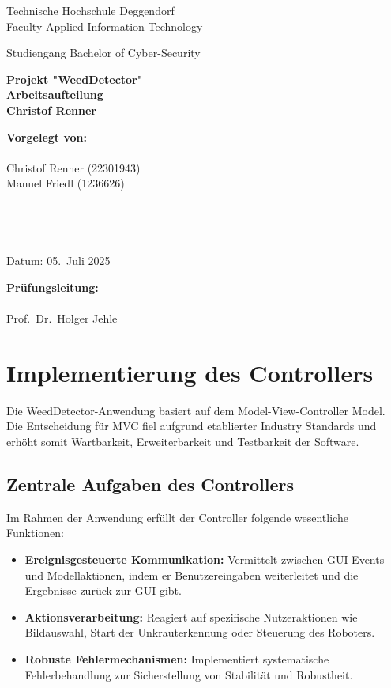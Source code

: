 \documentclass[12pt, a4paper]{scrreprt}
\newcommand{\faculty}{Faculty Applied Information Technology}
\newcommand{\studies}{Bachelor of Cyber-Security}
\newcommand{\thesistitleDE}{Projekt "WeedDetector" \\ Arbeitsaufteilung \\ Christof Renner}
\newcommand{\submissiondate}{05.\ Juli 2025}
\newcommand{\supervisor}{Prof.\ Dr.\ Holger Jehle}
\begin{document}
\begin{titlepage}
  \centering
  {\LARGE Technische Hochschule Deggendorf \\ \faculty \par}
  \vspace{0.3cm}
  {\Large Studiengang \studies \\[1.5cm]}
  {\Huge\bfseries \thesistitleDE\par}
  \vfill
  \begin{minipage}[t]{0.45\textwidth}
    \textbf{Vorgelegt von:}\\
    \\
    Christof Renner (22301943)\\
    Manuel Friedl (1236626)\\
    \\
    \\
    \\
    \\
    Datum: \submissiondate
  \end{minipage}\hfill
  \begin{minipage}[t]{0.45\textwidth}
    \textbf{Prüfungsleitung:}\\
    \\
    \supervisor
  \end{minipage}
\end{titlepage}

\tableofcontents
\newpage

\chapter{Implementierung des Controllers}

Die WeedDetector-Anwendung basiert auf dem Model-View-Controller Model. Die Entscheidung für MVC fiel aufgrund etablierter Industry Standards und erhöht somit Wartbarkeit, Erweiterbarkeit und Testbarkeit der Software.

\section{Zentrale Aufgaben des Controllers}

Im Rahmen der Anwendung erfüllt der Controller folgende wesentliche Funktionen:

\begin{itemize}
    \item \textbf{Ereignisgesteuerte Kommunikation:} Vermittelt zwischen GUI-Events und Modellaktionen, indem er Benutzereingaben weiterleitet und die Ergebnisse zurück zur GUI gibt.
    \item \textbf{Aktionsverarbeitung:} Reagiert auf spezifische Nutzeraktionen wie Bildauswahl, Start der Unkrauterkennung oder Steuerung des Roboters.
    \item \textbf{Robuste Fehlermechanismen:} Implementiert systematische Fehlerbehandlung zur Sicherstellung von Stabilität und Robustheit.
\end{itemize}
\end{document}
